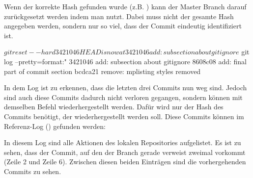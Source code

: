 Wenn der korrekte Hash gefunden wurde (z.B. ) kann der Master Branch darauf zurückgesetzt werden indem man  nutzt. Dabei muss nicht der gesamte Hash angegeben werden, sondern nur so viel, dass der Commit eindeutig identifiziert ist.
\begin{mplisting}
$ git reset --hard 3421046
HEAD is now at 3421046 add: subsection about gitignore
$ git log --pretty=format:"%
3421046 add: subsection about gitignore
8608c08 add: final part of commit section
bcdca21 remove: mplisting styles removed
\end{mplisting}
In dem Log ist zu erkennen, dass die letzten drei Commits nun weg sind. Jedoch sind auch diese Commits dadurch nicht verloren gegangen, sondern können mit demselben Befehl wiederhergestellt werden. Dafür wird nur der Hash des Commits benötigt, der wiederhergestellt werden soll. Diese Commits können im Referenz-Log () gefunden werden:
In diesem Log sind alle Aktionen des lokalen Repositories aufgelistet. Es ist zu sehen, dass der Commit, auf den der  Branch gerade verweist zweimal vorkommt (Zeile 2 und Zeile 6). Zwischen diesen beiden Einträgen sind die vorhergehenden Commits zu sehen.






